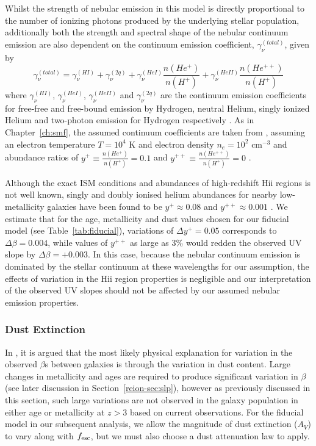 Whilst the strength of nebular emission in this model is directly proportional to the number of ionizing photons produced by the underlying stellar population, additionally both the strength and spectral shape of the nebular continuum emission are also dependent on the continuum emission coefficient, $\gamma^{(total)}_{\nu}$, given by
\begin{equation}\label{eq:cont_sep}
\gamma^{(total)}_{\nu} = \gamma^{(HI)}_{\nu} + \gamma^{(2q)}_{\nu} +  \gamma^{(HeI)}_{\nu}\frac{n(He^{+})} {n(H^{+})} + \gamma^{(HeII)}_{\nu}\frac{n(He^{++})} {n(H^{+})}
\end{equation}
where $\gamma^{(HI)}_{\nu}$, $\gamma^{(HeI)}_{\nu}$, $\gamma^{(HeII)}_{\nu}$ and $\gamma^{(2q)}_{\nu}$ are the continuum emission coefficients for free-free and free-bound emission by Hydrogen, neutral Helium, singly ionized Helium and two-photon emission for Hydrogen respectively \citep{1995A&A...303...41K}. As in Chapter~\ref{ch:smf}, the assumed continuum coefficients are taken from \citet{Osterbrock:2006ula}, assuming an electron temperature $T=10^4$ K and electron density $n_{e}=10^2$ cm$^{-3}$ and abundance ratios of $y^{+} \equiv \frac{n(He^{+})} {n(H^{+})} = 0.1$ and $y^{++} \equiv \frac{n(He^{++})} {n(H^{+})} = 0$ \citep{1995A&A...303...41K,Ono:2010ed}. 

Although the exact ISM conditions and abundances of high-redshift {\sc Hii} regions is not well known, singly and doubly ionised helium abundances for nearby low-metallicity galaxies have been found to be $y^{+} \approx 0.08$ and $y^{++} \approx 0.001$ \citep{Dinerstein:1986di,Izotov:1994fi,Hagele:2006eq}. We estimate that for the age, metallicity and dust values chosen for our fiducial model (see Table~\ref{tab:fiducial}), variations of $\Delta y^{+} = 0.05$ corresponds to $\Delta\beta = 0.004$, while values of $y^{++}$ as large as $3\%$ \citep{Izotov:2013ce} would redden the observed UV slope by $\Delta\beta = +0.003$. In this case, because the nebular continuum emission is dominated by the stellar continuum at these wavelengths for our assumption, the effects of variation in the {\sc Hii} region properties is negligible and our interpretation of the observed UV slopes should not be affected by our assumed nebular emission properties.

\subsubsection{Dust Extinction}\label{reion-sec:models_dust}
In \citet{Bouwens:2009ik}, it is argued that the most likely physical explanation for variation in the observed $\beta$s between galaxies is through the variation in dust content. Large changes in metallicity and ages are required to produce significant variation in $\beta$ (see later discussion in Section~\ref{reion-sec:slp}), however as previously discussed in this section, such large variations are not observed in the galaxy population in either age or metallicity at $z > 3$ based on current observations. For the fiducial model in our subsequent analysis, we allow the magnitude of dust extinction ($A_{V}$) to vary along with $f_{\rm{esc}}$, but we must also choose a dust attenuation law to apply.

